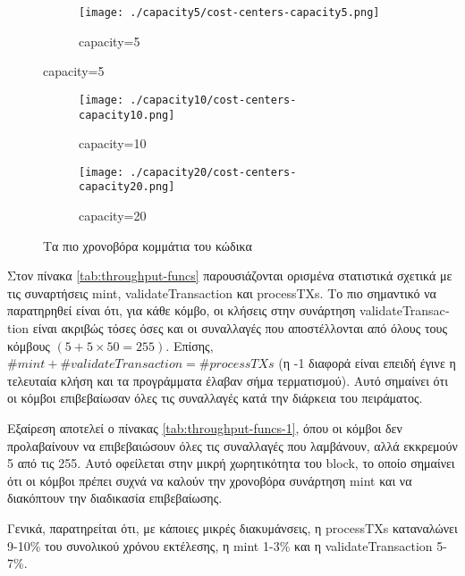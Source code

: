 \documentclass{article}
\newcommand{\eng}[1]{\foreignlanguage{english}{#1}} %
\begin{document}
\graphicspath{{../experiments/profiled\_outputs/throughputdel100ms/}}

\begin{figure}[ht]
    \centering
    \begin{subfigure}{\textwidth}
        \texttt{[image: ./capacity5/cost-centers-capacity5.png]}
        \caption{\eng{capacity=5}}
    \end{subfigure}
\end{figure}
\begin{figure}[ht]
    \ContinuedFloat
    \begin{subfigure}{\textwidth}
        \texttt{[image: ./capacity10/cost-centers-capacity10.png]}
        \caption{\eng{capacity=10}}
    \end{subfigure}
    \begin{subfigure}{\textwidth}
        \texttt{[image: ./capacity20/cost-centers-capacity20.png]}
        \caption{\eng{capacity=20}}
    \end{subfigure}
    \caption{Τα πιο χρονοβόρα κομμάτια του κώδικα}
    \label{fig:throughput-cost-centers}
\end{figure}
\FloatBarrier

Στον πίνακα \ref{tab:throughput-funcs} παρουσιάζονται ορισμένα στατιστικά σχετικά
με τις συναρτήσεις \eng{mint}, \eng{validateTransaction} και \eng{processTXs}.
Το πιο σημαντικό να παρατηρηθεί είναι ότι, για κάθε κόμβο, οι κλήσεις στην συνάρτηση
\eng{validateTransaction} είναι ακριβώς τόσες όσες και οι συναλλαγές που αποστέλλονται
από όλους τους κόμβους $\left(5 + 5 \times 50 = 255 \right)$. Επίσης, $\#mint +
\#validateTransaction = \#processTXs$ (η -1 διαφορά είναι επειδή έγινε η τελευταία κλήση
και τα προγράμματα έλαβαν σήμα τερματισμού). Αυτό σημαίνει ότι οι κόμβοι επιβεβαίωσαν
όλες τις συναλλαγές κατά την διάρκεια του πειράματος.

Εξαίρεση αποτελεί ο πίνακας \ref{tab:throughput-funcs-1}, όπου οι κόμβοι δεν προλαβαίνουν
να επιβεβαιώσουν όλες τις συναλλαγές που λαμβάνουν, αλλά εκκρεμούν 5 από τις 255. Αυτό
οφείλεται στην μικρή χωρητικότητα του \eng{block}, το οποίο σημαίνει ότι οι κόμβοι πρέπει
συχνά να καλούν την χρονοβόρα συνάρτηση \eng{mint} και να διακόπτουν την διαδικασία
επιβεβαίωσης.

Γενικά, παρατηρείται ότι, με κάποιες μικρές διακυμάνσεις, η \eng{processTXs}
καταναλώνει 9-10\% του συνολικού χρόνου εκτέλεσης, η \eng{mint} 1-3\% και
η \eng{validateTransaction} 5-7\%.
\end{document}
